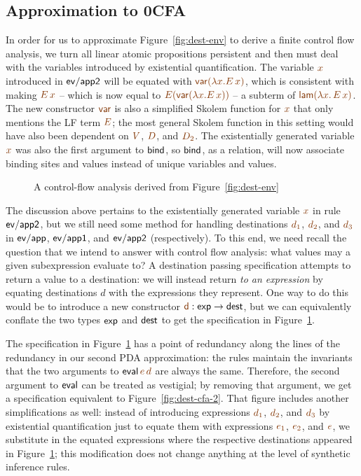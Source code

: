 \subsection{Approximation to 0CFA}

In order for us to approximate Figure~\ref{fig:dest-env} to derive a
finite control flow analysis, we turn all linear atomic propositions
persistent and then must deal with the variables introduced by
existential quantification. The variable $\lf{x}$ introduced in ${\sf
  ev/app2}$ will be equated with $\lf{{\sf var}(\lambda x.E\,x)}$,
which is consistent with making $\lf{E\,x}$ -- which is now equal to
$\lf{E({\sf var}(\lambda x.E\,x))}$ -- a subterm of $\lf{{\sf lam}(\lambda x.\, E\,x)}$.  The new
constructor $\lf{\sf var}$ is also a simplified Skolem
function for $\lf{x}$ that only mentions the LF term $\lf{E}$; the
most general Skolem function in this setting would have also been
dependent on $\lf{V}$, $\lf{D}$, and $\lf{D_2}$. The existentially
generated variable $\lf x$ was also the first argument to ${\sf bind}$,
so ${\sf bind}$, as a relation, will now associate binding sites
and values instead of unique variables and values. 

\begin{figure}[t]
\caption{A control-flow analysis derived from Figure~\ref{fig:dest-env}}
\label{fig:dest-cfa-1}
\end{figure}

The discussion above pertains to the existentially generated variable
$\lf{x}$ in rule ${\sf ev/app2}$, but we still need some method for
handling destinations $\lf{d_1}$, $\lf{d_2}$, and $\lf{d_3}$ in 
${\sf ev/app}$, ${\sf
  ev/app1}$, and ${\sf ev/app2}$ (respectively). To
this end, we need recall the question that we intend to answer with
control flow analysis: what values may a given subexpression evaluate
to? A destination passing specification attempts to return a value to
a destination: we will instead return {\it to an expression} by
equating destinations $d$ with the expressions they represent. One way
to do this would be to introduce a new constructor $\lf{\sf d}: {\sf
  exp} \rightarrow {\sf dest}$, but we can equivalently conflate the
two types ${\sf exp}$ and ${\sf dest}$ to get the specification in
Figure~\ref{fig:dest-cfa-1}.


The specification in Figure~\ref{fig:dest-cfa-1} has a point of
redundancy along the lines of the redundancy in our second PDA
approximation: the rules maintain the invariants that the two
arguments to ${\sf eval}\,\lf{e}\,\lf{d}$ are always the same. Therefore, the
second argument to ${\sf eval}$ can be treated as vestigial; by
removing that argument, we get a specification equivalent to
Figure~\ref{fig:dest-cfa-2}. That figure includes another
simplifications as well: instead of introducing expressions $\lf{d_1}$,
$\lf{d_2}$, and $\lf{d_3}$ by existential quantification just to equate them
with expressions $\lf{e_1}$, $\lf{e_2}$, and $\lf{e}$, 
we substitute in the equated
expressions where the respective destinations appeared in
Figure~\ref{fig:dest-cfa-1}; this modification does not change
anything at the level of  synthetic inference rules.

